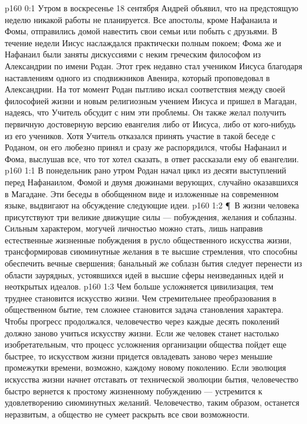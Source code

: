 \vs p160 0:1 Утром в воскресенье 18 сентября Андрей объявил, что на предстоящую неделю никакой работы не планируется. Все апостолы, кроме Нафанаила и Фомы, отправились домой навестить свои семьи или побыть с друзьями. В течение недели Иисус наслаждался практически полным покоем; Фома же и Нафанаил были заняты дискуссиями с неким греческим философом из Александрии по имени Родан. Этот грек недавно стал учеником Иисуса благодаря наставлениям одного из сподвижников Авенира, который проповедовал в Александрии. На тот момент Родан пытливо искал соответствия между своей философией жизни и новым религиозным учением Иисуса и пришел в Магадан, надеясь, что Учитель обсудит с ним эти проблемы. Он также желал получить первичную достоверную версию евангелия либо от Иисуса, либо от кого\hyp{}нибудь из его учеников. Хотя Учитель отказался принять участие в такой беседе с Роданом, он его любезно принял и сразу же распорядился, чтобы Нафанаил и Фома, выслушав все, что тот хотел сказать, в ответ рассказали ему об евангелии.
\vs p160 1:1 В понедельник рано утром Родан начал цикл из десяти выступлений перед Нафанаилом, Фомой и двумя дюжинами верующих, случайно оказавшихся в Магадане. Эти беседы в обобщенном виде и изложенные на современном языке, выдвигают на обсуждение следующие идеи.
\vs p160 1:2 \P\ В жизни человека присутствуют три великие движущие силы --- побуждения, желания и соблазны. Сильным характером, могучей личностью можно стать, лишь направив естественные жизненные побуждения в русло общественного искусства жизни, трансформировав сиюминутные желания в те высшие стремления, что способны обеспечить вечные свершения; банальный же соблазн бытия следует перенести из области заурядных, устоявшихся идей в высшие сферы неизведанных идей и неоткрытых идеалов.
\vs p160 1:3 Чем больше усложняется цивилизация, тем труднее становится искусство жизни. Чем стремительнее преобразования в общественном бытие, тем сложнее становится задача становления характера. Чтобы прогресс продолжался, человечество через каждые десять поколений должно заново учиться искусству жизни. Если же человек станет настолько изобретательным, что процесс усложнения организации общества пойдет еще быстрее, то искусством жизни придется овладевать заново через меньшие промежутки времени, возможно, каждому новому поколению. Если эволюция искусства жизни начнет отставать от технической эволюции бытия, человечество быстро вернется к простому жизненному побуждению --- устремится к удовлетворению сиюминутных желаний. Человечество, таким образом, останется неразвитым, а общество не сумеет раскрыть все свои возможности.
